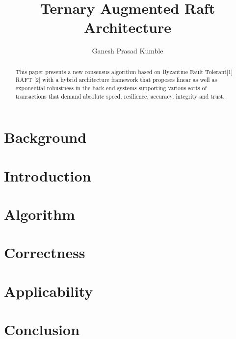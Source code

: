 \documentclass[]{article}
\title{Ternary Augmented Raft Architecture}
\author{Ganesh Prasad Kumble}
\begin{document}
\date{}
\maketitle

\begin{abstract}
This paper presents a new consensus algorithm based on Byzantine Fault Tolerant[1] RAFT [2] with a hybrid architecture framework that proposes linear as well as exponential robustness in the back-end systems supporting various sorts of transactions that demand absolute speed, resilience, accuracy, integrity and trust.
\end{abstract}

\section{Background}

\section{Introduction}

\section{Algorithm}

\section{Correctness}

\section{Applicability}

\section{Conclusion}

\newpage

 

\end{document}
